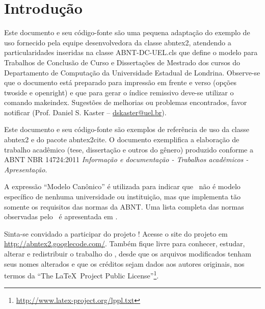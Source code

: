 \documentclass[
	12pt,				%
	openright,			%
	twoside,			%
	a4paper,			%
	tcc,			%
	]{ABNT-CCT-UENP}
\begin{document}
\tableofcontents*
\cleardoublepage



\textual
\pagestyle{uenp-header} %


\chapter{Introdução}

Este documento e seu código-fonte são uma pequena adaptação do exemplo de uso
fornecido pela equipe desenvolvedora da classe \textsf{abntex2}, atendendo a
particularidades inseridas na classe \textsf{ABNT-DC-UEL.cls} que define
o modelo para Trabalhos de Conclusão de Curso e Dissertações de Mestrado dos
cursos do Departamento de Computação da Universidade Estadual de Londrina.
Observe-se que o documento está preparado para impressão em frente e verso
(opções twoside e openright) e que para gerar o índice remissivo deve-se 
utilizar o comando \textsf{makeindex}.
Sugestões de melhorias ou problemas encontrados, favor notificar (Prof.
Daniel S. Kaster -- \href{mailto:dskaster@uel.br}{dskaster@uel.br}).

Este documento e seu código-fonte são exemplos de referência de uso da classe
\textsf{abntex2} e do pacote \textsf{abntex2cite}. O documento 
exemplifica a elaboração de trabalho acadêmico (tese, dissertação e outros do
gênero) produzido conforme a ABNT NBR 14724:2011 \emph{Informação e documentação
- Trabalhos acadêmicos - Apresentação}.

A expressão ``Modelo Canônico'' é utilizada para indicar que \abnTeX\ não é
modelo específico de nenhuma universidade ou instituição, mas que implementa tão
somente os requisitos das normas da ABNT. Uma lista completa das normas
observadas pelo \abnTeX\ é apresentada em .

Sinta-se convidado a participar do projeto \abnTeX! Acesse o site do projeto em
\url{http://abntex2.googlecode.com/}. Também fique livre para conhecer,
estudar, alterar e redistribuir o trabalho do \abnTeX, desde que os arquivos
modificados tenham seus nomes alterados e que os créditos sejam dados aos
autores originais, nos termos da ``The \LaTeX\ Project Public
License''\footnote{\url{http://www.latex-project.org/lppl.txt}}.
\end{document}
